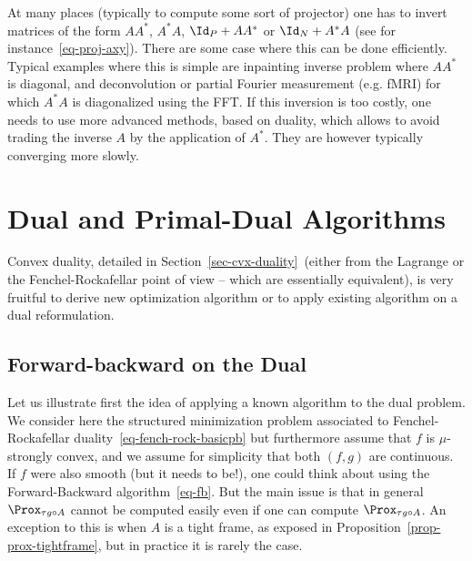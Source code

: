 \begin{rem}\label{rem-inv-lin}
	At many places (typically to compute some sort of projector) one has to invert matrices of the form 
	$AA^*$, $A^*A$, $\Id_P+AA^*$ or $\Id_N+A^*A$ (see for instance~\eqref{eq-proj-axy}).
	There are some case where this can be done efficiently.
	Typical examples where this is simple are inpainting inverse problem where $AA^*$ is diagonal, and deconvolution or partial Fourier measurement (e.g. fMRI) for which $A^*A$ is diagonalized using the FFT.
	If this inversion is too costly, one needs to use more advanced methods, based on duality, which allows to avoid trading the inverse $A$ by the application of $A^*$. They are however typically converging more slowly.
\end{rem}

\section{Dual and Primal-Dual Algorithms}

Convex duality, detailed in Section~\ref{sec-cvx-duality} (either from the Lagrange or the Fenchel-Rockafellar point of view -- which are essentially equivalent), is very fruitful to derive new optimization algorithm or to apply existing algorithm on a dual reformulation.

\subsection{Forward-backward on the Dual}
\label{sec-fb-dual}

Let us illustrate first the idea of applying a known algorithm to the dual problem. We consider here the structured minimization problem associated to Fenchel-Rockafellar duality~\eqref{eq-fench-rock-basicpb}
but furthermore assume that $f$ is $\mu$-strongly convex, and we assume for simplicity that both $(f,g)$ are continuous. If $f$ were also smooth (but it needs to be!), one could think about using the Forward-Backward algorithm~\eqref{eq-fb}. But the main issue is that in general $\Prox_{\tau g \circ A}$ cannot be computed easily even if one can compute $\Prox_{\tau g \circ A}$. An exception to this is when $A$ is a tight frame, as exposed in Proposition~\ref{prop-prox-tightframe}, but in practice it is rarely the case. 

